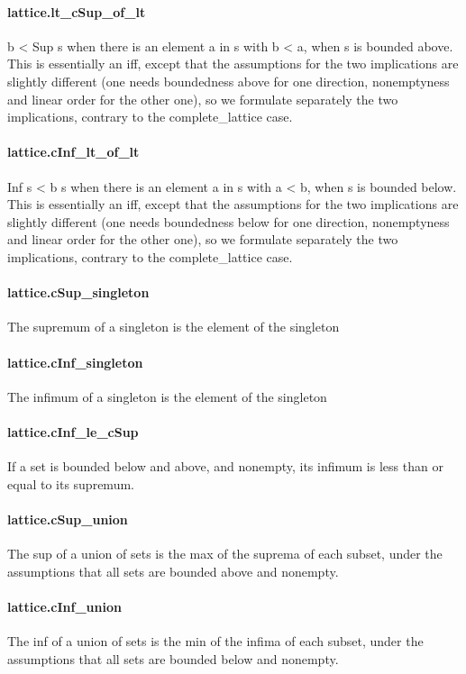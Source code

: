 \documentclass{article}
\begin{document}
\paragraph{lattice.lt\_cSup\_of\_lt}
\par
b 
<
 Sup s when there is an element a in s with b 
<
 a, when s is bounded above.
This is essentially an iff, except that the assumptions for the two implications are
slightly different (one needs boundedness above for one direction, nonemptyness and linear
order for the other one), so we formulate separately the two implications, contrary to
the complete\_lattice case.
\paragraph{lattice.cInf\_lt\_of\_lt}
\par
Inf s 
<
 b s when there is an element a in s with a 
<
 b, when s is bounded below.
This is essentially an iff, except that the assumptions for the two implications are
slightly different (one needs boundedness below for one direction, nonemptyness and linear
order for the other one), so we formulate separately the two implications, contrary to
the complete\_lattice case.
\paragraph{lattice.cSup\_singleton}
\par
The supremum of a singleton is the element of the singleton
\paragraph{lattice.cInf\_singleton}
\par
The infimum of a singleton is the element of the singleton
\paragraph{lattice.cInf\_le\_cSup}
\par
If a set is bounded below and above, and nonempty, its infimum is less than or equal to
its supremum.
\paragraph{lattice.cSup\_union}
\par
The sup of a union of sets is the max of the suprema of each subset, under the assumptions
that all sets are bounded above and nonempty.
\paragraph{lattice.cInf\_union}
\par
The inf of a union of sets is the min of the infima of each subset, under the assumptions
that all sets are bounded below and nonempty.
\end{document}
